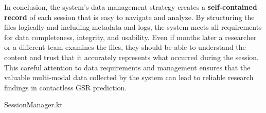 In conclusion, the system's data management strategy creates a
\textbf{self-contained record} of each session that is easy to navigate and
analyze. By structuring the files logically and including metadata and
logs, the system meets all requirements for data completeness,
integrity, and usability. Even if months later a researcher or a
different team examines the files, they should be able to understand the
content and trust that it accurately represents what occurred during the
session. This careful attention to data requirements and management
ensures that the valuable multi-modal data collected by the system can
lead to reliable research findings in contactless GSR prediction.


SessionManager.kt
